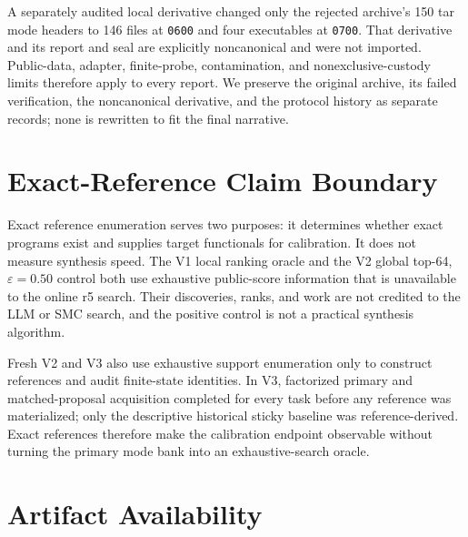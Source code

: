 \documentclass[twoside,11pt]{article}
\begin{document}
A separately audited local derivative changed only the rejected archive's 150
tar mode headers to 146 files at \texttt{0600} and four executables at
\texttt{0700}. That derivative and its report and seal are explicitly
noncanonical and were not imported. Public-data, adapter, finite-probe,
contamination, and nonexclusive-custody limits therefore apply to every report.
We preserve the original archive, its failed verification, the noncanonical
derivative, and the protocol history as separate records; none is rewritten to
fit the final narrative.

\section{Exact-Reference Claim Boundary}
\label{app:oracle}

Exact reference enumeration serves two purposes: it determines whether exact
programs exist and supplies target functionals for calibration. It does not
measure synthesis speed. The V1 local ranking oracle and the V2 global top-64,
$\varepsilon=0.50$ control both use exhaustive public-score information that is
unavailable to the online r5 search. Their discoveries, ranks, and work are not
credited to the LLM or SMC search, and the positive control is not a practical
synthesis algorithm.

Fresh V2 and V3 also use exhaustive support enumeration only to construct
references and audit finite-state identities. In V3, factorized primary and
matched-proposal acquisition completed for every task before any reference was
materialized; only the descriptive historical sticky baseline was
reference-derived. Exact references therefore make the calibration endpoint
observable without turning the primary mode bank into an exhaustive-search
oracle.

\section{Artifact Availability}
\label{app:availability}
\end{document}
